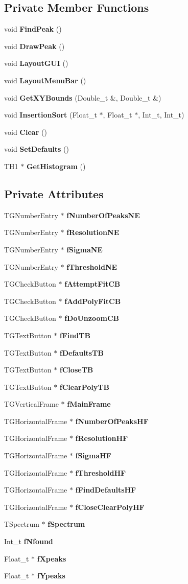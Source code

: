 \subsection*{Private Member Functions}
\begin{DoxyCompactItemize}
\item 
void {\bf FindPeak} ()
\item 
void {\bf DrawPeak} ()
\item 
void {\bf LayoutGUI} ()
\item 
void {\bf LayoutMenuBar} ()
\item 
void {\bf GetXYBounds} (Double\_\-t \&, Double\_\-t \&)
\item 
void {\bf InsertionSort} (Float\_\-t $\ast$, Float\_\-t $\ast$, Int\_\-t, Int\_\-t)
\item 
void {\bf Clear} ()
\item 
void {\bf SetDefaults} ()
\item 
TH1 $\ast$ {\bf GetHistogram} ()
\end{DoxyCompactItemize}
\subsection*{Private Attributes}
\begin{DoxyCompactItemize}
\item 
TGNumberEntry $\ast$ {\bf fNumberOfPeaksNE}
\item 
TGNumberEntry $\ast$ {\bf fResolutionNE}
\item 
TGNumberEntry $\ast$ {\bf fSigmaNE}
\item 
TGNumberEntry $\ast$ {\bf fThresholdNE}
\item 
TGCheckButton $\ast$ {\bf fAttemptFitCB}
\item 
TGCheckButton $\ast$ {\bf fAddPolyFitCB}
\item 
TGCheckButton $\ast$ {\bf fDoUnzoomCB}
\item 
TGTextButton $\ast$ {\bf fFindTB}
\item 
TGTextButton $\ast$ {\bf fDefaultsTB}
\item 
TGTextButton $\ast$ {\bf fCloseTB}
\item 
TGTextButton $\ast$ {\bf fClearPolyTB}
\item 
TGVerticalFrame $\ast$ {\bf fMainFrame}
\item 
TGHorizontalFrame $\ast$ {\bf fNumberOfPeaksHF}
\item 
TGHorizontalFrame $\ast$ {\bf fResolutionHF}
\item 
TGHorizontalFrame $\ast$ {\bf fSigmaHF}
\item 
TGHorizontalFrame $\ast$ {\bf fThresholdHF}
\item 
TGHorizontalFrame $\ast$ {\bf fFindDefaultsHF}
\item 
TGHorizontalFrame $\ast$ {\bf fCloseClearPolyHF}
\item 
TSpectrum $\ast$ {\bf fSpectrum}
\item 
Int\_\-t {\bf fNfound}
\item 
Float\_\-t $\ast$ {\bf fXpeaks}
\item 
Float\_\-t $\ast$ {\bf fYpeaks}
\end{DoxyCompactItemize}



